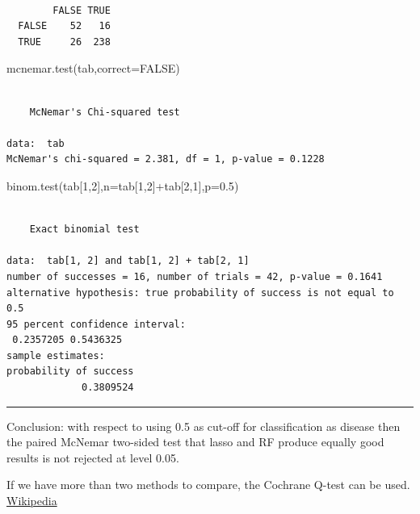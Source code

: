 \documentclass[
  letterpaper,
  DIV=11,
  numbers=noendperiod]{scrartcl}
\newenvironment{Shaded}{\begin{snugshade}}{\end{snugshade}}
\newcommand{\AttributeTok}[1]{\textcolor[rgb]{0.40,0.45,0.13}{#1}}
\newcommand{\ConstantTok}[1]{\textcolor[rgb]{0.56,0.35,0.01}{#1}}
\newcommand{\DecValTok}[1]{\textcolor[rgb]{0.68,0.00,0.00}{#1}}
\newcommand{\FloatTok}[1]{\textcolor[rgb]{0.68,0.00,0.00}{#1}}
\newcommand{\FunctionTok}[1]{\textcolor[rgb]{0.28,0.35,0.67}{#1}}
\newcommand{\NormalTok}[1]{\textcolor[rgb]{0.00,0.23,0.31}{#1}}
\newcommand{\SpecialCharTok}[1]{\textcolor[rgb]{0.37,0.37,0.37}{#1}}
\begin{document}
\begin{verbatim}
       
        FALSE TRUE
  FALSE    52   16
  TRUE     26  238
\end{verbatim}

\begin{Shaded}
\begin{Highlighting}[]
\FunctionTok{mcnemar.test}\NormalTok{(tab,}\AttributeTok{correct=}\ConstantTok{FALSE}\NormalTok{)}
\end{Highlighting}
\end{Shaded}

\begin{verbatim}

    McNemar's Chi-squared test

data:  tab
McNemar's chi-squared = 2.381, df = 1, p-value = 0.1228
\end{verbatim}

\begin{Shaded}
\begin{Highlighting}[]
\FunctionTok{binom.test}\NormalTok{(tab[}\DecValTok{1}\NormalTok{,}\DecValTok{2}\NormalTok{],}\AttributeTok{n=}\NormalTok{tab[}\DecValTok{1}\NormalTok{,}\DecValTok{2}\NormalTok{]}\SpecialCharTok{+}\NormalTok{tab[}\DecValTok{2}\NormalTok{,}\DecValTok{1}\NormalTok{],}\AttributeTok{p=}\FloatTok{0.5}\NormalTok{)}
\end{Highlighting}
\end{Shaded}

\begin{verbatim}

    Exact binomial test

data:  tab[1, 2] and tab[1, 2] + tab[2, 1]
number of successes = 16, number of trials = 42, p-value = 0.1641
alternative hypothesis: true probability of success is not equal to 0.5
95 percent confidence interval:
 0.2357205 0.5436325
sample estimates:
probability of success 
             0.3809524 
\end{verbatim}

\begin{center}\rule{0.5\linewidth}{0.5pt}\end{center}

Conclusion: with respect to using 0.5 as cut-off for classification as
disease then the paired McNemar two-sided test that lasso and RF produce
equally good results is not rejected at level 0.05.

If we have more than two methods to compare, the Cochrane Q-test can be
used.
\href{https://en.wikipedia.org/wiki/Cochran\%27s_Q_test}{Wikipedia}
\end{document}
